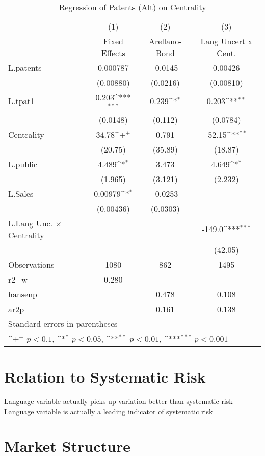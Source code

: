 \begin{table}[htbp]\centering \caption{Regression of Patents (Alt) on Centrality\label{r9}}
{
\def\sym#1{\ifmmode^{#1}\else\(^{#1}\)\fi}
\begin{tabular}{l*{3}{c}}
\hline\hline
                    &\multicolumn{1}{c}{(1)}&\multicolumn{1}{c}{(2)}&\multicolumn{1}{c}{(3)}\\
                    &\multicolumn{1}{c}{Fixed Effects}&\multicolumn{1}{c}{Arellano-Bond}&\multicolumn{1}{c}{Lang Uncert x Cent.}\\
\hline
L.patents           &    0.000787         &     -0.0145         &     0.00426         \\
                    &   (0.00880)         &    (0.0216)         &   (0.00810)         \\
L.tpat1             &       0.203\sym{***}&       0.239\sym{*}  &       0.203\sym{**} \\
                    &    (0.0148)         &     (0.112)         &    (0.0784)         \\
Centrality          &       34.78\sym{+}  &       0.791         &      -52.15\sym{**} \\
                    &     (20.75)         &     (35.89)         &     (18.87)         \\
L.public            &       4.489\sym{*}  &       3.473         &       4.649\sym{*}  \\
                    &     (1.965)         &     (3.121)         &     (2.232)         \\
L.Sales             &     0.00979\sym{*}  &     -0.0253         &                     \\
                    &   (0.00436)         &    (0.0303)         &                     \\
L.Lang Unc. $\times$ Centrality&                     &                     &      -149.0\sym{***}\\
                    &                     &                     &     (42.05)         \\
\hline
Observations        &        1080         &         862         &        1495         \\
r2\_w                &       0.280         &                     &                     \\
hansenp             &                     &       0.478         &       0.108         \\
ar2p                &                     &       0.161         &       0.138         \\
\hline\hline
\multicolumn{4}{l}{\footnotesize Standard errors in parentheses}\\
\multicolumn{4}{l}{\footnotesize \sym{+} \(p<0.1\), \sym{*} \(p<0.05\), \sym{**} \(p<0.01\), \sym{***} \(p<0.001\)}\\
\end{tabular}
}
\end{table}


\section{Relation to Systematic Risk}
 Language variable actually picks up variation better than systematic risk
 Language variable is actually a leading indicator of systematic risk

\section{Market Structure}

